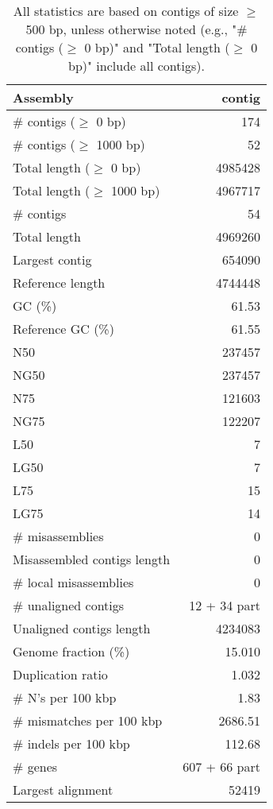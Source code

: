 \documentclass[12pt,a4paper]{article}
\begin{document}
\begin{table}[ht]
\begin{center}
\caption{All statistics are based on contigs of size $\geq$ 500 bp, unless otherwise noted (e.g., "\# contigs ($\geq$ 0 bp)" and "Total length ($\geq$ 0 bp)" include all contigs).}
\begin{tabular}{|l*{1}{|r}|}
\hline
Assembly & contig \\ \hline
\# contigs ($\geq$ 0 bp) & 174 \\ \hline
\# contigs ($\geq$ 1000 bp) & 52 \\ \hline
Total length ($\geq$ 0 bp) & 4985428 \\ \hline
Total length ($\geq$ 1000 bp) & 4967717 \\ \hline
\# contigs & 54 \\ \hline
Total length & 4969260 \\ \hline
Largest contig & 654090 \\ \hline
Reference length & 4744448 \\ \hline
GC (\%) & 61.53 \\ \hline
Reference GC (\%) & 61.55 \\ \hline
N50 & 237457 \\ \hline
NG50 & 237457 \\ \hline
N75 & 121603 \\ \hline
NG75 & 122207 \\ \hline
L50 & 7 \\ \hline
LG50 & 7 \\ \hline
L75 & 15 \\ \hline
LG75 & 14 \\ \hline
\# misassemblies & 0 \\ \hline
Misassembled contigs length & 0 \\ \hline
\# local misassemblies & 0 \\ \hline
\# unaligned contigs & 12 + 34 part \\ \hline
Unaligned contigs length & 4234083 \\ \hline
Genome fraction (\%) & 15.010 \\ \hline
Duplication ratio & 1.032 \\ \hline
\# N's per 100 kbp & 1.83 \\ \hline
\# mismatches per 100 kbp & 2686.51 \\ \hline
\# indels per 100 kbp & 112.68 \\ \hline
\# genes & 607 + 66 part \\ \hline
Largest alignment & 52419 \\ \hline
\end{tabular}
\end{center}
\end{table}
\end{document}
